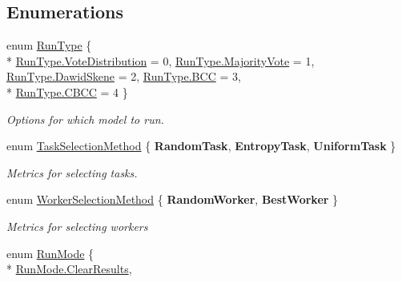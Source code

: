 \subsection*{Enumerations}
\begin{DoxyCompactItemize}
\item 
enum \hyperlink{namespace_crowdsourcing_models_ae187d0e1d9fe64e7ebcb9d948d02d2d0}{Run\+Type} \{ \\*
\hyperlink{namespace_crowdsourcing_models_ae187d0e1d9fe64e7ebcb9d948d02d2d0af6c35bf8a6bbb9f7b7d7e9505b0199a4}{Run\+Type.\+Vote\+Distribution} = 0, 
\hyperlink{namespace_crowdsourcing_models_ae187d0e1d9fe64e7ebcb9d948d02d2d0a7aa11c546d2299308f7bbdc7750e20e8}{Run\+Type.\+Majority\+Vote} = 1, 
\hyperlink{namespace_crowdsourcing_models_ae187d0e1d9fe64e7ebcb9d948d02d2d0a1a0fe590c885551647c3f78463da3a0b}{Run\+Type.\+Dawid\+Skene} = 2, 
\hyperlink{namespace_crowdsourcing_models_ae187d0e1d9fe64e7ebcb9d948d02d2d0a1fc5efe020980df2413a97ce9f2f586f}{Run\+Type.\+B\+C\+C} = 3, 
\\*
\hyperlink{namespace_crowdsourcing_models_ae187d0e1d9fe64e7ebcb9d948d02d2d0ad38f8fcb687a14cf5c9351a299aa8d19}{Run\+Type.\+C\+B\+C\+C} = 4
 \}\begin{DoxyCompactList}\small\item\em Options for which model to run. \end{DoxyCompactList}
\item 
enum \hyperlink{namespace_crowdsourcing_models_a1bb21d66b6c86daa36af97d919528356}{Task\+Selection\+Method} \{ {\bfseries Random\+Task}, 
{\bfseries Entropy\+Task}, 
{\bfseries Uniform\+Task}
 \}\begin{DoxyCompactList}\small\item\em Metrics for selecting tasks. \end{DoxyCompactList}
\item 
enum \hyperlink{namespace_crowdsourcing_models_a1f0e849dc0691caa8fda0ce7778756a6}{Worker\+Selection\+Method} \{ {\bfseries Random\+Worker}, 
{\bfseries Best\+Worker}
 \}\begin{DoxyCompactList}\small\item\em Metrics for selecting workers \end{DoxyCompactList}
\item 
enum \hyperlink{namespace_crowdsourcing_models_ac2299b85781ea82aa2c8850723c8a063}{Run\+Mode} \{ \\*
\hyperlink{namespace_crowdsourcing_models_ac2299b85781ea82aa2c8850723c8a063a22fb04e637893f1a158838192ae8b5a8}{Run\+Mode.\+Clear\+Results}, 

\end{DoxyCompactItemize}
